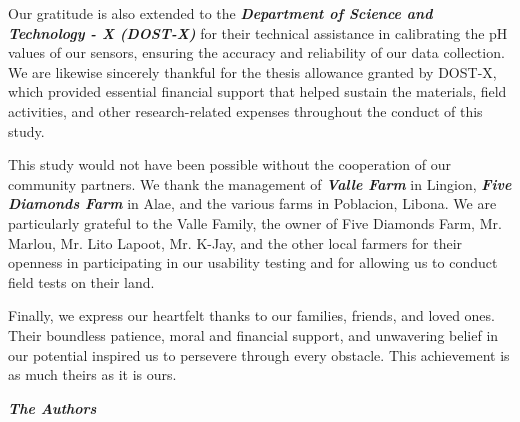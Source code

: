 {	Our gratitude is also extended to the \textbf{\textit{Department of Science and Technology - X (DOST-X)}} for their technical assistance in calibrating the pH values of our sensors, ensuring the accuracy and reliability of our data collection. We are likewise sincerely thankful for the thesis allowance granted by DOST-X, which provided essential financial support that helped sustain the materials, field activities, and other research-related expenses throughout the conduct of this study.
	
	This study would not have been possible without the cooperation of our community partners. We thank the management of \textbf{\textit{Valle Farm}} in Lingion, \textbf{\textit{Five Diamonds Farm}} in Alae, and the various farms in Poblacion, Libona. We are particularly grateful to the Valle Family, the owner of Five Diamonds Farm, Mr. Marlou, Mr. Lito Lapoot, Mr. K-Jay, and the other local farmers for their openness in participating in our usability testing and for allowing us to conduct field tests on their land.
	
	Finally, we express our heartfelt thanks to our families, friends, and loved ones. Their boundless patience, moral and financial support, and unwavering belief in our potential inspired us to persevere through every obstacle. This achievement is as much theirs as it is ours.
	
	\vspace{24pt}
	
	\begin{flushright}
		\textbf{\textit{The Authors}}
	\end{flushright}
	
}